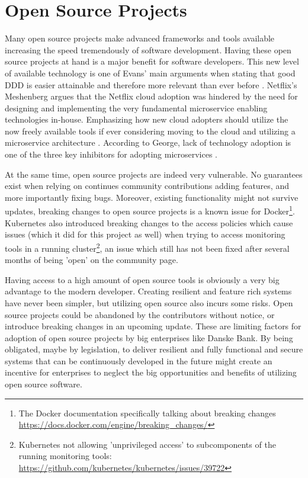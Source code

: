 \section{Open Source Projects}
Many open source projects make advanced frameworks and tools available increasing the speed tremendously of software development. Having these open source projects at hand is a major benefit for software developers. This new level of available technology is one of Evans' main arguments when stating that good DDD is easier attainable and therefore more relevant than ever before \cite[t.~28:21]{evans2016tackling}. Netflix's Meshenberg argues that the Netflix cloud adoption was hindered by the need for designing and implementing the very fundamental microservice enabling technologies in-house. Emphasizing how new cloud adopters should utilize the now freely available tools if ever considering moving to the cloud and utilizing a microservice architecture \cite[t.~38:18]{meshenberg2016microservices}. According to George, lack of technology adoption is one of the three key inhibitors for adopting microservices \cite[t.~12:45]{george2016it}.

At the same time, open source projects are indeed very vulnerable. No guarantees exist when relying on continues community contributions adding features, and more importantly fixing bugs. Moreover, existing functionality might not survive updates, breaking changes to open source projects is a known issue for Docker\footnote{The Docker documentation specifically talking about breaking changes \url{https://docs.docker.com/engine/breaking_changes/}}. Kubernetes also introduced breaking changes to the access policies which cause issues (which it did for this project as well) when trying to access monitoring tools in a running cluster\footnote{Kubernetes not allowing 'unprivileged access' to subcomponents of the running monitoring tools: \url{https://github.com/kubernetes/kubernetes/issues/39722}}, an issue which still has not been fixed after several months of being 'open' on the community page.

Having access to a high amount of open source tools is obviously a very big advantage to the modern developer. Creating resilient and feature rich systems have never been simpler, but utilizing open source also incurs some risks. Open source projects could be abandoned by the contributors without notice, or introduce breaking changes in an upcoming update. These are limiting factors for adoption of open source projects by big enterprises like Danske Bank. By being obligated, maybe by legislation, to deliver resilient and fully functional and secure systems that can be continuously developed in the future might create an incentive for enterprises to neglect the big opportunities and benefits of utilizing open source software.